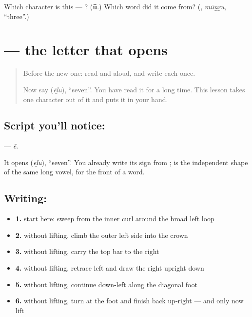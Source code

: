 \begin{tcolorbox}[breakable,colback=teal!4,colframe=teal!35!black,title={Before you move on}]
Which character is this — ? (\textbf{ū}.) Which word did it come from? (\textbf{}, \emph{mūṉṟu}, \textquotedblleft{}three\textquotedblright{}.)
\end{tcolorbox}
\section[\texorpdfstring{\ta{ஏ} (ē)}{ஏ (ē)}]{ — the letter that opens }

\label{lesson:TA-S136-letter-ee}



\begin{quote}
Before the new one: read  and  aloud, and write each once.

Now say \textbf{} (\emph{ēḻu}), \textquotedblleft{}seven\textquotedblright{}. You have read it for a long time. This lesson takes one character out of it and puts it in your hand.
\end{quote}

\subsection*{Script you'll notice: }
\textbf{} — \emph{ē}.

It opens \textbf{} (\emph{ēḻu}), \textquotedblleft{}seven\textquotedblright{}. You already write its sign  from ;  is the independent shape of the same long vowel, for the front of a word.

\subsection*{Writing: }

\begin{itemize}
\raggedright
  \item \textbf{1.} start here: sweep from the inner curl around the broad left loop
  \item \textbf{2.} without lifting, climb the outer left side into the crown
  \item \textbf{3.} without lifting, carry the top bar to the right
  \item \textbf{4.} without lifting, retrace left and draw the right upright down
  \item \textbf{5.} without lifting, continue down-left along the diagonal foot
  \item \textbf{6.} without lifting, turn at the foot and finish back up-right — and only now lift
\end{itemize}

